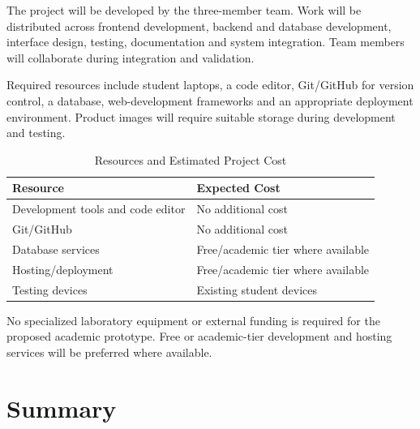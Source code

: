 \documentclass[11pt,a4paper]{article}
\begin{document}
The project will be developed by the three-member team. Work will be
distributed across frontend development, backend and database
development, interface design, testing, documentation and system
integration. Team members will collaborate during integration and
validation.

Required resources include student laptops, a code editor,
Git/GitHub for version control, a database, web-development
frameworks and an appropriate deployment environment. Product images
will require suitable storage during development and testing.

\begin{table}[H]
\centering

\renewcommand{\arraystretch}{1.3}

\begin{tabular}{
    p{7.0cm}
    p{5.1cm}
}

\toprule

\textbf{Resource} &
\textbf{Expected Cost}
\\

\midrule

Development tools and code editor &
No additional cost
\\

Git/GitHub &
No additional cost
\\

Database services &
Free/academic tier where available
\\

Hosting/deployment &
Free/academic tier where available
\\

Testing devices &
Existing student devices
\\

\bottomrule

\end{tabular}

\caption{Resources and Estimated Project Cost}

\end{table}

No specialized laboratory equipment or external funding is required
for the proposed academic prototype. Free or academic-tier
development and hosting services will be preferred where available.


\section{Summary}
\end{document}
